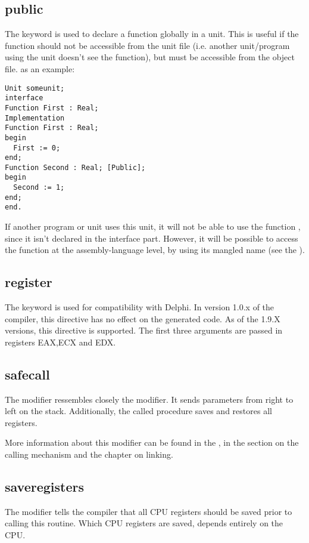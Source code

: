\subsection{public}
The  keyword is used to declare a function globally in a unit.
This is useful if the function should not be accessible from the unit
file (i.e. another unit/program using the unit doesn't see the function),
but must be accessible from the object file. as an example:
\begin{verbatim}
Unit someunit;
interface
Function First : Real;
Implementation
Function First : Real;
begin
  First := 0;
end;
Function Second : Real; [Public];
begin
  Second := 1;
end;
end.
\end{verbatim}
If another program or unit uses this unit, it will not be able to use the
function , since it isn't declared in the interface part.
However, it will be possible to access the function  at the
assembly-language level, by using its mangled name (see the \progref).

\subsection{register}
\label{se:register}
The  keyword is used for compatibility with Delphi. In
version 1.0.x of the compiler, this directive has no effect on the
generated code. As of the 1.9.X versions, this directive is supported. The
first three arguments are passed in registers EAX,ECX and EDX.

\subsection{safecall}
The  modifier ressembles closely the  modifier. 
It sends parameters from right to left on the stack. Additionally, the 
called procedure saves and restores all registers.

More information about this modifier can be found in the \progref, in the
section on the calling mechanism and the chapter on linking.

\subsection{saveregisters}
The  modifier tells the compiler that all CPU registers should be 
saved prior to calling this routine. Which CPU registers are saved, depends
entirely on the CPU.

